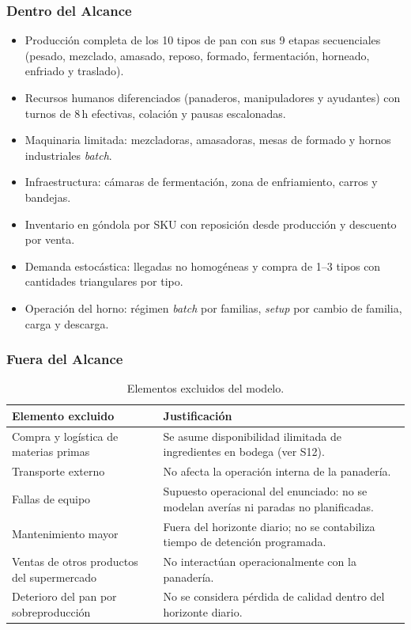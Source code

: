\documentclass[10pt, a4paper]{article}
\begin{document}
\subsubsection{Dentro del Alcance}

\begin{itemize}
  \item Producci\'on completa de los 10 tipos de pan con sus 9 etapas
    secuenciales (pesado, mezclado, amasado, reposo, formado, fermentaci\'on,
    horneado, enfriado y traslado).
  \item Recursos humanos diferenciados (panaderos, manipuladores y
    ayudantes) con turnos de 8\,h efectivas, colaci\'on y pausas
    escalonadas.
  \item Maquinaria limitada: mezcladoras, amasadoras, mesas de formado y
    hornos industriales \emph{batch}.
  \item Infraestructura: c\'amaras de fermentaci\'on, zona de enfriamiento,
    carros y bandejas.
  \item Inventario en g\'ondola por SKU con reposici\'on desde producci\'on y
    descuento por venta.
  \item Demanda estoc\'astica: llegadas no homog\'eneas y compra de
    1--3 tipos con cantidades triangulares por tipo.
  \item Operaci\'on del horno: r\'egimen \emph{batch} por familias,
    \emph{setup} por cambio de familia, carga y descarga.
\end{itemize}

\subsubsection{Fuera del Alcance}

\begin{table}[H]
\centering
\caption{Elementos excluidos del modelo.}
\label{tab:fuera_alcance}
\renewcommand{\arraystretch}{1.25}
\begin{tabularx}{\textwidth}{>{\raggedright\arraybackslash}p{5.0cm} X}
\toprule
\rowcolor{azulClaro}
\textbf{Elemento excluido} & \textbf{Justificaci\'on} \\
\midrule
Compra y log\'istica de materias primas
  & Se asume disponibilidad ilimitada de ingredientes en bodega (ver S12). \\
\rowcolor{grisClaro}
Transporte externo
  & No afecta la operaci\'on interna de la panader\'ia. \\
Fallas de equipo
  & Supuesto operacional del enunciado: no se modelan averías ni paradas
    no planificadas. \\
\rowcolor{grisClaro}
Mantenimiento mayor
  & Fuera del horizonte diario; no se contabiliza tiempo de detenci\'on
    programada. \\
Ventas de otros productos del supermercado
  & No interact\'uan operacionalmente con la panader\'ia. \\
\rowcolor{grisClaro}
Deterioro del pan por sobreproducci\'on
  & No se considera p\'erdida de calidad dentro del horizonte diario. \\
\bottomrule
\end{tabularx}
\end{table}
\end{document}
